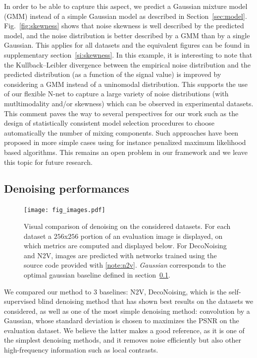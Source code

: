 \documentclass{article}
\begin{document}
In order to be able to capture this aspect, we predict a Gaussian mixture model (GMM) instead of a simple Gaussian model as described in Section~\ref{sec:model}. Fig.~\ref{fig:skewness} shows that noise skewness is well described by the predicted model, and the noise distribution is better described by a GMM than by a single Gaussian.
This applies for all datasets and the equivalent figures can be found in supplementary section~\ref{si:skewness}.
In this example, it is interesting to note that the Kullback–Leibler divergence between the empirical noise distribution and the predicted distribution (as a function of the signal value) is improved by considering a GMM instead of a uninomodal distribution.
This supports the use of our flexible N-net to capture a large variety of noise distributions (with mutltimodality and/or skewness) which can be observed in experimental datasets.
This comment paves the way to several perspectives for our work such as the design of statistically consistent model selection procedures to choose automatically the number of mixing components.
Such approaches have been proposed in more simple cases using for instance penalized maximum likelihood based algorithms.
This remains an open problem in our framework and we leave this topic for future research.

\subsection{Denoising performances}
\label{sec:perf}
\begin{figure}
\vskip 0.2in
\hskip -0.625in
\texttt{[image: fig\_images.pdf]}
\caption{Visual comparison of denoising on the considered datasets. For each dataset a $256$x$256$ portion of an evaluation image is displayed, on which metrics are computed and displayed below. For DecoNoising and N2V, images are predicted with networks trained using the source code provided with \cite{goncharova2020}\cref{note:n2v}. \textit{Gaussian} corresponds to the optimal gaussian baseline defined in section~\ref{sec:perf}.}
\label{fig:images}
\vskip -0.2in
\end{figure}

We compared our method to 3 baselines: N2V, DecoNoising, which is the self-supervised blind denoising method that has shown best results on the datasets we considered, as well as one of the most simple denoising method: convolution by a Gaussian, whose standard deviation is chosen to maximizes the PSNR on the evaluation dataset.
We believe the latter makes a good reference, as it is one of the simplest denoising methods, and it removes noise efficiently but also other high-frequency information such as local contrasts.
\end{document}
